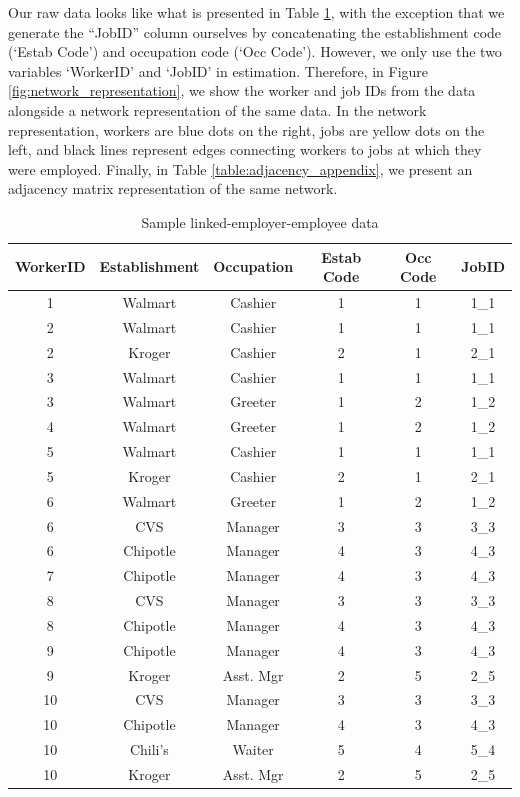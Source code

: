 \documentclass[12pt]{article}
\theoremstyle{definition}
\theoremstyle{plain}
\begin{document}
\label{sec:visual_representation}


Our raw data looks like what is presented in Table \ref{table:sample_leed}, with the exception that we generate the ``JobID'' column ourselves by concatenating the establishment code (`Estab Code') and occupation code (`Occ Code'). However, we only use the two variables `WorkerID' and `JobID' in estimation. Therefore, in Figure \ref{fig:network_representation}, we show the worker and job IDs from the data alongside a network representation of the same data. In the network representation, workers are blue dots on the right, jobs are yellow dots on the left, and black lines represent edges connecting workers to jobs at which they were employed. Finally, in Table \ref{table:adjacency_appendix}, we present an adjacency matrix representation of the same network. 

\begin{table}[h!]
	\caption{Sample linked-employer-employee data}
	\centering
	\begin{tabular}{cccccc}
		\toprule
		WorkerID	& Establishment	& Occupation	& Estab Code	& Occ Code	& JobID	\\
		\midrule
		1	& Walmart	& Cashier	& 1	& 1	& 1\_1	\\
		2	& Walmart	& Cashier	& 1	& 1	& 1\_1	\\
		2	& Kroger	& Cashier	& 2	& 1	& 2\_1	\\
		3	& Walmart	& Cashier	& 1	& 1	& 1\_1	\\
		3	& Walmart	& Greeter	& 1	& 2	& 1\_2	\\
		4	& Walmart	& Greeter	& 1	& 2	& 1\_2	\\
		5	& Walmart	& Cashier	& 1	& 1	& 1\_1	\\
		5	& Kroger	& Cashier	& 2	& 1	& 2\_1	\\
		6	& Walmart	& Greeter	& 1	& 2	& 1\_2	\\
		6	& CVS		& Manager	& 3	& 3	& 3\_3	\\
		6	& Chipotle	& Manager	& 4	& 3	& 4\_3	\\
		7	& Chipotle	& Manager	& 4	& 3	& 4\_3	\\
		8	& CVS		& Manager	& 3	& 3	& 3\_3	\\
		8	& Chipotle	& Manager	& 4	& 3	& 4\_3	\\
		9	& Chipotle	& Manager	& 4	& 3	& 4\_3	\\
		9	& Kroger	& Asst. Mgr	& 2	& 5	& 2\_5	\\
		10	& CVS		& Manager	& 3	& 3	& 3\_3	\\
		10	& Chipotle	& Manager	& 4	& 3	& 4\_3	\\
		10	& Chili's	& Waiter	& 5	& 4	& 5\_4	\\
		10	& Kroger	& Asst. Mgr	& 2	& 5	& 2\_5	\\
		\bottomrule
	\end{tabular} 
	\label{table:sample_leed}
\end{table} 
\end{document}
